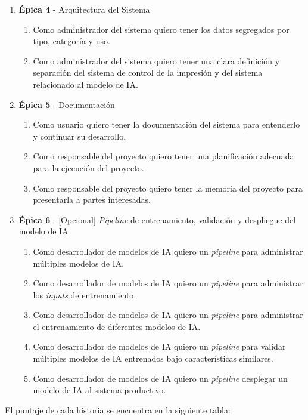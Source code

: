 \documentclass[
11pt, %
]{charter}
\begin{document}
\begin{enumerate}
\begin{enumerate}
    \end{enumerate}
  \item \textbf{\'{E}pica 4} - Arquitectura del Sistema
    \begin{enumerate}
      \item Como administrador del sistema quiero tener los datos segregados por tipo, categoría y uso.
      \item Como administrador del sistema quiero tener una clara definición y separación del sistema de control de la impresión y del sistema relacionado al modelo de IA.
    \end{enumerate}
  \item \textbf{\'{E}pica 5} - Documentación
    \begin{enumerate}
      \item Como usuario quiero tener la documentación del sistema para entenderlo y continuar su desarrollo.
      \item Como responsable del proyecto quiero tener una planificación adecuada para la ejecución del proyecto.
      \item Como responsable del proyecto quiero tener la memoria del proyecto para presentarla a partes interesadas.
    \end{enumerate}
  \item \textbf{\'{E}pica 6} - [Opcional] \textit{Pipeline} de entrenamiento, validación y despliegue del modelo de IA
    \begin{enumerate}
      \item Como desarrollador de modelos de IA quiero un \textit{pipeline} para administrar múltiples modelos de IA.
      \item Como desarrollador de modelos de IA quiero un \textit{pipeline} para administrar los \textit{inputs} de entrenamiento.
      \item Como desarrollador de modelos de IA quiero un \textit{pipeline} para administrar el entrenamiento de diferentes modelos de IA.
      \item Como desarrollador de modelos de IA quiero un \textit{pipeline} para validar múltiples modelos de IA entrenados bajo características similares.
      \item Como desarrollador de modelos de IA quiero un \textit{pipeline} desplegar un modelo de IA al sistema productivo.
    \end{enumerate}
\end{enumerate}

El puntaje de cada historia se encuentra en la siguiente tabla:
\end{document}

